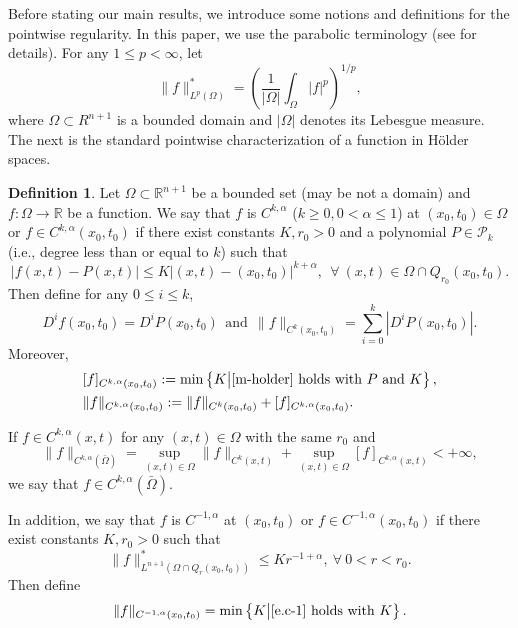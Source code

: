 \documentclass[preprint,12pt]{elsarticle}
\theoremstyle{definition}
\newtheorem{definition}[theorem]{Definition}
\theoremstyle{remark}
\numberwithin{equation}{section}
\begin{document}
Before stating our main results, we introduce some notions and definitions for the pointwise regularity. In this paper, we use the parabolic terminology (see  for details). For any $1\leq p <\infty$, let
\begin{equation*}
\|f\|^*_{L^p(\Omega)}= \left(\frac{1}{|\Omega|}\int_{\Omega} |f|^p\right)^{1/p},
\end{equation*}
where $\Omega\subset R^{n+1}$ is a bounded domain and $|\Omega|$ denotes its Lebesgue measure. The next is the standard pointwise characterization of a function in H\"{o}lder spaces.
\begin{definition}\label{d-f}
Let $\Omega\subset \mathbb{R}^{n+1}$ be a bounded set (may be not a domain) and $f:\Omega\rightarrow \mathbb{R}$ be a function. We say that $f$ is $C^{k,\alpha}$ ($k\geq 0, 0<\alpha\leq 1$) at $(x_0,t_0)\in \Omega$ or $f\in C^{k, \alpha}(x_0,t_0)$ if there exist constants $K,r_0>0$ and a polynomial $P\in \mathcal{P}_k$ (i.e., degree less than or equal to $k$) such that
\begin{equation}\label{m-holder}
  |f(x,t)-P(x,t)|\leq K|(x,t)-(x_0,t_0)|^{k+\alpha},~~\forall~(x,t)\in \Omega\cap Q_{r_0}(x_0,t_0).
\end{equation}
Then define for any $0\leq i\leq k$,
\begin{equation*}
  D^if(x_0,t_0)=D^iP(x_0,t_0)~~\mbox{and}~~
  \|f\|_{C^{k}(x_0,t_0)}=\sum_{i=0}^{k} |D^i P(x_0,t_0)|.
\end{equation*}
Moreover,
\begin{equation*}
\begin{aligned}
&[f]_{C^{k,\alpha}(x_0,t_0)}:=\min \left\{K\big | \cref{m-holder} ~\mbox{holds with}~P~\mbox{and}~K\right\}, \\
&\|f\|_{C^{k,\alpha}(x_0,t_0)}:=\|f\|_{C^{k}(x_0,t_0)}+[f]_{C^{k,\alpha}(x_0,t_0)}.
\end{aligned}
\end{equation*}

If $f\in C^{k, \alpha}(x,t)$ for any $(x,t)\in \Omega$ with the same $r_0$ and
\begin{equation*}
  \|f\|_{C^{k,\alpha}(\bar{\Omega})}= \sup_{(x,t)\in \Omega} \|f\|_{C^{k}(x,t)}+\sup_{(x,t)\in \Omega} [f]_{C^{k, \alpha}(x,t)}<+\infty,
\end{equation*}
we say that $f\in C^{k,\alpha}(\bar{\Omega})$.

In addition, we say that $f$ is $C^{-1,\alpha}$ at $(x_0,t_0)$ or $f\in C^{-1,\alpha}(x_0,t_0)$ if there exist constants $K,r_0>0$ such that
\begin{equation}\label{e.c-1}
\|f\|^*_{L^{n+1}(\Omega\cap Q_r(x_0,t_0) )}\leq Kr^{-1+\alpha}, ~\forall ~0<r<r_0.
\end{equation}
Then define
\begin{equation*}
\|f\|_{C^{-1,\alpha}(x_0,t_0)}=\min \left\{K \big | \cref{e.c-1} ~\mbox{holds with}~K\right\}.
\end{equation*}


\end{definition}
\end{document}
